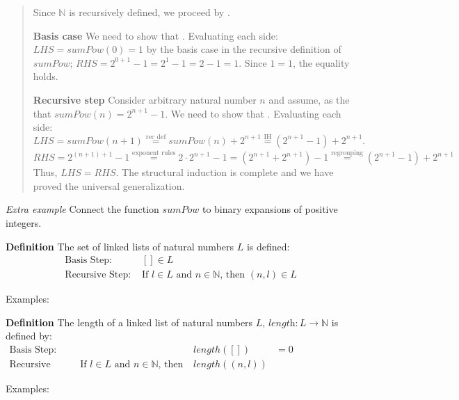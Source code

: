 \documentclass[12pt, oneside]{article}
\begin{document}
\begin{quote}
Since $\mathbb{N}$ is recursively defined, we proceed by \underline{}.

{\bf Basis case} We need to show that \underline{}.
Evaluating each side: $LHS = sumPow(0) = 1$ by the basis case in the recursive definition
of $sumPow$; $RHS = 2^{0+1} - 1 = 2^1 - 1 = 2-1 = 1$. Since $1=1$, the equality holds.

{\bf Recursive step} Consider arbitrary natural number $n$ and assume, as the 
\underline{\phantom{Induction Hypothesis (IH)}} that $sumPow(n) = 2^{n+1} - 1$. We need to show that
\underline{}.  Evaluating each side: 
\[
LHS = sumPow(n+1) \overset{\text{rec def}}{=} sumPow(n)  + 2^{n+1}\overset{\text{IH}}{=} (2^{n+1} - 1) + 2^{n+1}.
\]
\[
RHS = 2^{(n+1)+1}- 1 \overset{\text{exponent rules}}{=} 2 \cdot 2^{n+1} -1  = \left(2^{n+1} + 2^{n+1} \right) - 1
\overset{\text{regrouping}}{=}  (2^{n+1} - 1) + 2^{n+1} 
\]
Thus, $LHS = RHS$. The structural induction is complete and we have proved the universal generalization.
\end{quote}



\vfill
{\it Extra example} Connect the function $sumPow$ to binary expansions of positive integers.

\newpage
{\bf Definition} The set of linked lists of natural numbers $L$ is defined:
\[
\begin{array}{ll}
    \textrm{Basis Step: } & [] \in L \\
    \textrm{Recursive Step: } & \textrm{If } l \in L\textrm{ and }n \in \mathbb{N} \textrm{, then } (n, l) \in L
\end{array}
\]

Examples: 

\vfill

{\bf Definition} The length of a linked list of natural numbers $L$, $\textit{length}: L \to \mathbb{N}$ is defined by:
\[
\begin{array}{llll}
\textrm{Basis Step:} &  & length([]) &= 0 \\
\textrm{Recursive Step:} & \textrm{If } l \in L\textrm{ and }n \in \mathbb{N}\textrm{, then  } & length((n, l))  &\phantom{= 1+ length(l)}
\end{array}
\]

Examples: 
\end{document}
